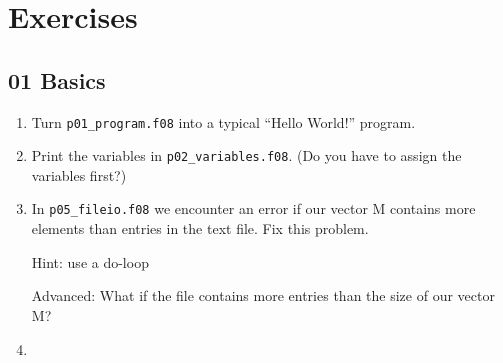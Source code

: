 
\section{Exercises}

\subsection{01 Basics}
\begin{enumerate}
 \item Turn \verb!p01_program.f08! into a typical ``Hello World!'' program.

 \item Print the variables in \verb!p02_variables.f08!. (Do you have to assign the variables first?)

 \item In \verb!p05_fileio.f08! we encounter an error if our vector M contains more elements than entries in the text file. Fix this problem.

Hint: use a do-loop

Advanced: What if the file contains more entries than the size of our vector M?

 \item 
\end{enumerate}
